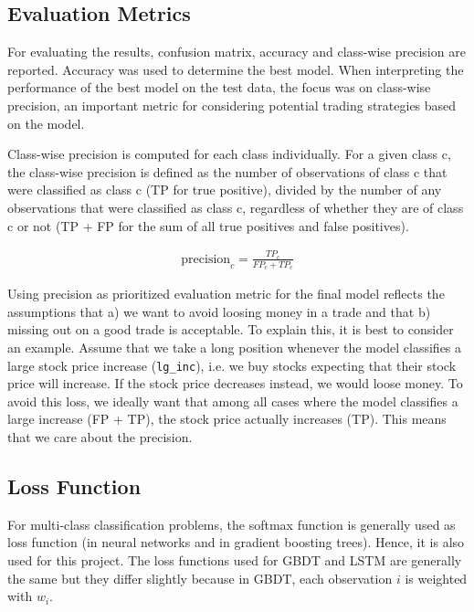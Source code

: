 \documentclass{article}
\begin{document}
	
	\subsection{Evaluation Metrics}
	
	For evaluating the results, confusion matrix, accuracy and class-wise precision are reported. Accuracy was used to determine the best model. When interpreting the performance of the best model on the test data, the focus was on class-wise precision, an important metric for considering potential trading strategies based on the model.
	
	Class-wise precision is computed for each class individually. For a given class c, the class-wise precision is defined as the number of observations of class c that were classified as class c (TP for true positive), divided by the number of any observations that were classified as class c, regardless of whether they are of class c or not (TP + FP for the sum of all true positives and false positives).
	
	\begin{align}
	\mathrm{precision}_c = \frac{TP_c}{FP_c + TP_c}
	\end{align}
	
	Using precision as prioritized evaluation metric for the final model reflects the assumptions that a) we want to avoid loosing money in a trade and that b) missing out on a good trade is acceptable. To explain this, it is best to consider an example. Assume that we take a long position whenever the model classifies a large stock price increase (\verb|lg_inc|), i.e. we buy stocks expecting that their stock price will increase. If the stock price decreases instead, we would loose money. To avoid this loss, we ideally want that among all cases where the model classifies a large increase (FP + TP), the stock price actually increases (TP). This means that we care about the precision. 

	
	\subsection{Loss Function}
	
	For multi-class classification problems, the softmax function is generally used as loss function (in neural networks and in gradient boosting trees). Hence, it is also used for this project. The loss functions used for GBDT and LSTM are generally the same but they differ slightly because in GBDT, each observation $i$ is weighted with $w_i$.
	
\end{document}
